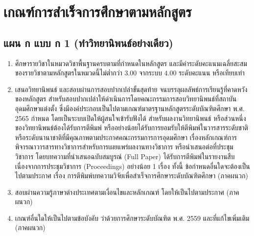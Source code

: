 \section{เกณฑ์การสำเร็จการศึกษาตามหลักสูตร}
\subsection{แผน ก แบบ ก 1 (ทำวิทยานิพนธ์อย่างเดียว)}
\begin{enumerate}
   	\item ศึกษารายวิชาในหมวดวิชาพื้นฐานครบตามที่กำหนดในหลักสูตร และมีค่าระดับคะแนนเฉลี่ยสะสมของรายวิชาตามหลักสูตรในหมวดนี้ไม่ต่ำกว่า $3.00$ จากระบบ $4.00$ ระดับคะแนน หรือเทียบเท่า
   	\item เสนอวิทยานิพนธ์ และสอบผ่านการสอบปากเปล่าขั้นสุดท้าย จนบรรลุผลลัพธ์การเรียนรู้ที่คาดหวังของหลักสูตร สำหรับสอบปากเปล่าให้ดำเนินการโดยคณะกรรมการสอบวิทยานิพนธ์ที่สถาบันอุดมศึกษาแต่งตั้ง ซึ่งมีองค์ประกอบเป็นไปตามเกณฑ์มาตรฐานหลักสูตรระดับบัณฑิตศึกษา พ.ศ. 2565 กำหนด โดยเป็นระบบเปิดให้ผู้สนใจเข้ารับฟังได้ สำหรับผลงานวิทยานิพนธ์ หรือส่วนหนึ่งของวิทยานิพนธ์ต้องได้รับการตีพิมพ์ หรืออย่างน้อยได้รับการยอมรับให้ตีพิมพ์ในวารสารระดับชาติหรือระดับนานาชาติที่มีคุณภาพตามประกาศคณะกรรมการการอุดมศึกษา เรื่องหลักเกณฑ์การพิจารณาวารสารทางวิชาการสำหรับการเผยแพร่ผลงานทางวิชาการ 
   		   หรือนำเสนอต่อที่ประชุมวิชาการ โดยบทความที่นำเสนอฉบับสมบูรณ์ (Full Paper) ได้รับการตีพิมพ์ในรายงานสืบเนื่องจากการประชุมวิชาการ (Proceedings) อย่างน้อย 1 เรื่อง ทั้งนี้ ข้อกำหนดอื่นใดจะต้องเป็นไปตามประกาศ \university{} เรื่อง การตีพิมพ์บทความวิจัยเพื่อสำเร็จการศึกษาระดับบัณฑิตศึกษา (ภาคผนวก)
   	\item สอบผ่านความรู้ภาษาต่างประเทศตามเงื่อนไขและหลักเกณฑ์ โดยให้เป็นไปตามประกาศ\university{} (ภาคผนวก)
   	\item เกณฑ์อื่นใดให้เป็นไปตามข้อบังคับ\university{} ว่าด้วยการศึกษาระดับบัณฑิต พ.ศ. 2559 และที่แก้ไขเพิ่มเติม (ภาคผนวก)   	 
   	\end{enumerate}
